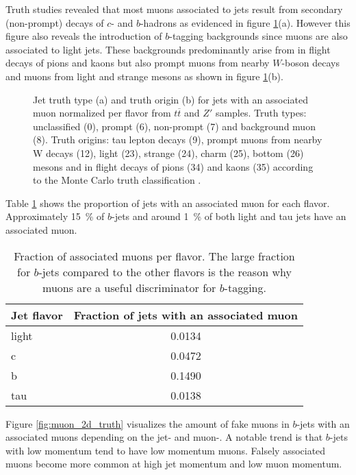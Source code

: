 Truth studies revealed that most muons associated to jets result from secondary (non-prompt) decays of $c$- and $b$-hadrons as evidenced in figure \ref{fig:muonTruth}(a). However this figure also reveals the introduction of $b$-tagging backgrounds since muons are also associated to light jets. These backgrounds predominantly arise from in flight decays of pions and kaons but also prompt muons from nearby $W$-boson decays and muons from light and strange mesons as shown in figure \ref{fig:muonTruth}(b).
\begin{figure}[]
  \centering
  \caption{Jet truth type (a) and truth origin (b) for jets with an associated muon normalized per flavor from $t\overline{t}$ and $Z'$ samples. Truth types: unclassified (0), prompt (6), non-prompt (7) and background muon (8). Truth origins: tau lepton decays (9), prompt muons from nearby W decays (12), light (23), strange (24), charm (25), bottom (26) mesons and in flight decays of pions (34) and kaons (35) according to the Monte Carlo truth classification \citep{mctruthclassification}.}
  \label{fig:muonTruth}
\end{figure}
Table \ref{tab:MuonJetFlavors} shows the proportion of jets with an associated muon for each flavor. Approximately \qty{15}{\percent} of $b$-jets and around \qty{1}{\percent} of both light and tau jets have an associated muon.
\begin{table}[]
  \caption{Fraction of associated muons per flavor. The large fraction for $b$-jets compared to the other flavors is the reason why muons are a useful discriminator for $b$-tagging. }
  \label{tab:MuonJetFlavors}
  \centering
  \begin{tabular}{ l c }
    \hline
    Jet flavor & Fraction of jets with an associated muon \\
    \hline
    light      & 0.0134                                   \\
    c          & 0.0472                                   \\
    b          & 0.1490                                   \\
    tau        & 0.0138                                   \\
    \hline
  \end{tabular}
\end{table}
Figure \ref{fig:muon_2d_truth} visualizes the amount of fake muons in $b$-jets with an associated muons depending on the jet- and muon-\pt. A notable trend is that $b$-jets with low momentum tend to have low momentum muons. Falsely associated muons become more common at high jet momentum and low muon momentum.
